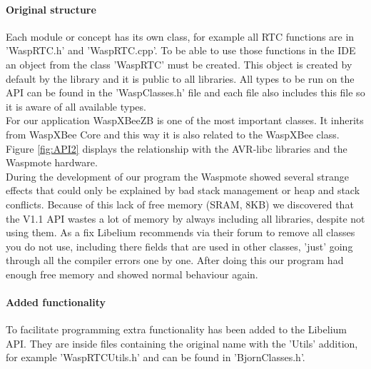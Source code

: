 \paragraph{Original structure}
\label{object}
Each module or concept has its own class, for example all RTC functions are in 'WaspRTC.h' and 'WaspRTC.cpp'. To be able to use those functions in the IDE an object from the class 'WaspRTC' must be created. This object is created by default by the library and it is public to all libraries. All types to be run on the API can be found in the 'WaspClasses.h' file and each file also includes this file so it is aware of all available types.\\
For our application WaspXBeeZB is one of the most important classes. It inherits from WaspXBee Core and this way it is also related to the WaspXBee class. Figure \ref{fig:API2} displays the relationship with the AVR-libc libraries and the Waspmote hardware.\\ 
During the development of our program the Waspmote showed several strange effects that could only be explained by bad stack management or heap and stack conflicts. Because of this lack of free memory (SRAM, 8KB) we discovered that the V1.1 API wastes a lot of memory by always including all libraries, despite not using them. As a fix Libelium recommends via their forum to remove all classes you do not use, including there fields that are used in other classes, 'just' going through all the compiler errors one by one. After doing this our program had enough free memory and showed normal behaviour again.
\paragraph{Added functionality}
To facilitate programming extra functionality has been added to the Libelium API. They are inside files containing the original name with the 'Utils' addition, for example 'WaspRTCUtils.h' and can be found in 'BjornClasses.h'.
